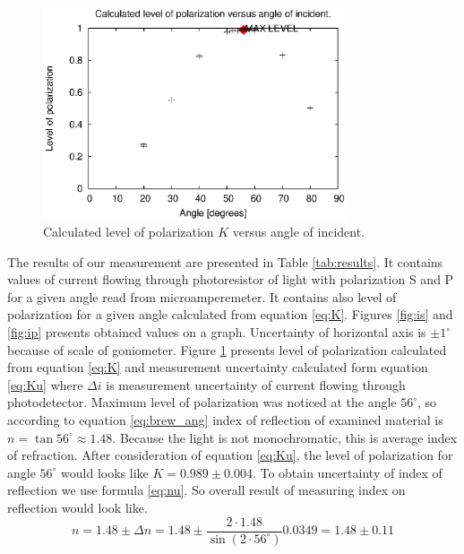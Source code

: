 \documentclass[a4paper,12pt]{article}
\begin{document}
\begin{figure}[ht]
    \begin{center}
        \includegraphics[width=0.80\textwidth]{pollev}
        \caption{Calculated level of polarization $K$ versus angle of incident.}
        \label{fig:pollev}
    \end{center}
\end{figure}

The results of our measurement are presented in Table \ref{tab:results}. It contains values of current flowing through photoresistor of light with polarization S and P for a given angle read from microamperemeter. It contains also level of polarization for a given angle calculated from equation \ref{eq:K}. Figures \ref{fig:is} and \ref{fig:ip} presents obtained values on a graph. Uncertainty of horizontal axis is $\pm 1^{\circ}$ because of scale of goniometer. Figure \ref{fig:pollev} presents level of polarization calculated from equation \ref{eq:K} and measurement uncertainty calculated  form equation \ref{eq:Ku} where $\Delta i$ is measurement uncertainty of current flowing through photodetector. Maximum level of polarization was noticed at the angle $56^{\circ}$, so according to equation \ref{eq:brew_ang} index of reflection of examined material is $n = \tan 56^{\circ} \approx 1.48 $. Because the light is not monochromatic, this is average index of refraction. After consideration of equation \ref{eq:Ku}, the level of polarization for angle $56^{\circ}$ would looks like $K = 0.989\pm 0.004$. To obtain uncertainty of index of reflection we use formula \ref{eq:nu}. So overall result of measuring index on reflection would look like.
\begin{equation}
    n = 1.48 \pm \Delta n = 1.48 \pm \frac{2\cdot 1.48}{\sin (2 \cdot 56^{\circ})} 0.0349 = 1.48 \pm 0.11 \label{eq:nuv}
\end{equation}
\end{document}

